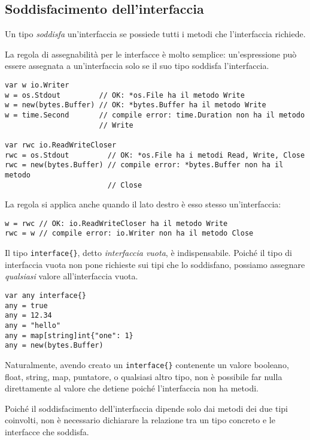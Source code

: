 \documentclass[../../thesis.tex]{subfiles}
\begin{document}
    \subsection{Soddisfacimento dell'interfaccia}\label{subsec:soddisfacimento-dell'interfaccia}
    Un tipo \textit{soddisfa} un'interfaccia se possiede tutti i metodi che l'interfaccia richiede.
    \hfill \vspace{12pt}

    La regola di assegnabilità per le interfacce è molto semplice: un'espressione può essere assegnata a un'interfaccia solo se il suo tipo soddisfa l'interfaccia.
    \begin{lstlisting}[frame = single,label={lst:lstlisting6-3.1}]
var w io.Writer
w = os.Stdout         // OK: *os.File ha il metodo Write
w = new(bytes.Buffer) // OK: *bytes.Buffer ha il metodo Write
w = time.Second       // compile error: time.Duration non ha il metodo
                      // Write

var rwc io.ReadWriteCloser
rwc = os.Stdout         // OK: *os.File ha i metodi Read, Write, Close
rwc = new(bytes.Buffer) // compile error: *bytes.Buffer non ha il metodo
                        // Close
    \end{lstlisting}
    La regola si applica anche quando il lato destro è esso stesso un'interfaccia:
    \begin{lstlisting}[frame = single,label={lst:lstlisting6-3.2}]
w = rwc // OK: io.ReadWriteCloser ha il metodo Write
rwc = w // compile error: io.Writer non ha il metodo Close
    \end{lstlisting}
    Il tipo \verb"interface{}", detto \textit{interfaccia vuota}, è indispensabile.
    Poiché il tipo di interfaccia vuota non pone richieste sui tipi che lo soddisfano, possiamo assegnare \textit{qualsiasi} valore all'interfaccia vuota.
    \begin{lstlisting}[frame = single,label={lst:lstlisting6-3.3}]
var any interface{}
any = true
any = 12.34
any = "hello"
any = map[string]int{"one": 1}
any = new(bytes.Buffer)
    \end{lstlisting}
    Naturalmente, avendo creato un \verb"interface{}" contenente un valore booleano, float, string, map, puntatore, o qualsiasi altro tipo, non è possibile far nulla direttamente al valore che detiene poiché l'interfaccia non ha metodi.
    \hfill \vspace{12pt}

    Poiché il soddisfacimento dell'interfaccia dipende solo dai metodi dei due tipi coinvolti, non è necessario dichiarare la relazione tra un tipo concreto e le interfacce che soddisfa.
    \hfill \vspace{12pt}
\end{document}
